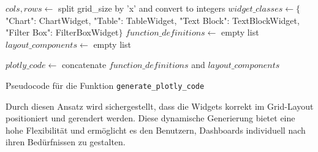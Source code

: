 \documentclass[a4paper, 12pt]{scrartcl}
\begin{document}
\begin{algorithm}[H]
\SetAlgoLined
{}
$cols, rows \gets$ split grid\_size by 'x' and convert to integers\;
$widget\_classes \gets \{$"Chart": ChartWidget, "Table": TableWidget, "Text Block": TextBlockWidget, "Filter Box": FilterBoxWidget$\}$\;
$function\_definitions \gets$ empty list\;
$layout\_components \gets$ empty list\;


$plotly\_code \gets$ concatenate $function\_definitions$ and $layout\_components$\;
\caption{Pseudocode für die Funktion \texttt{generate\_plotly\_code}}
\end{algorithm}

Durch diesen Ansatz wird sichergestellt, dass die Widgets korrekt im Grid-Layout positioniert und gerendert werden. Diese dynamische Generierung bietet eine hohe Flexibilität und ermöglicht es den Benutzern, Dashboards individuell nach ihren Bedürfnissen zu gestalten.
\end{document}
